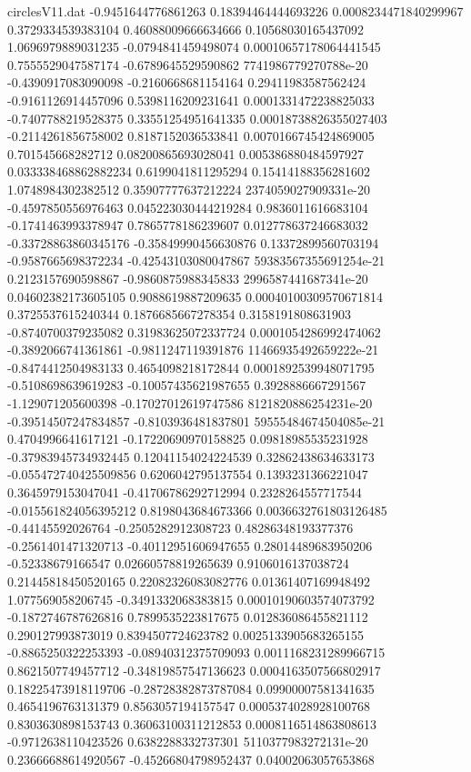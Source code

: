 \begin{filecontents}{circlesV11.dat}
-0.9451644776861263	0.18394464444693226	0.0008234471840299967
0.3729334539383104	0.46088009666634666	0.10568030165437092
1.0696979889031235	-0.0794841459498074	0.00010657178064441545
0.7555529047587174	-0.6789645529590862	7741986779270788e-20
-0.4390917083090098	-0.2160668681154164	0.29411983587562424
-0.9161126914457096	0.5398116209231641	0.0001331472238825033
-0.7407788219528375	0.33551254951641335	0.00018738826355027403
-0.2114261856758002	0.8187152036533841	0.0070166745424869005
0.701545668282712	0.08200865693028041	0.005386880484597927
0.033338468862882234	0.6199041811295294	0.15414188356281602
1.0748984302382512	0.35907777637212224	2374059027909331e-20
-0.4597850556976463	0.045223030444219284	0.9836011616683104
-0.1741463993378947	0.7865778186239607	0.012778637246683032
-0.33728863860345176	-0.35849990456630876	0.13372899560703194
-0.9587665698372234	-0.42543103080047867	59383567355691254e-21
0.2123157690598867	-0.9860875988345833	2996587441687341e-20
0.04602382173605105	0.9088619887209635	0.00040100309570671814
0.3725537615240344	0.1876685667278354	0.3158191808631903
-0.8740700379235082	0.31983625072337724	0.0001054286992474062
-0.3892066741361861	-0.9811247119391876	11466935492659222e-21
-0.8474412504983133	0.4654098218172844	0.0001892539948071795
-0.5108698639619283	-0.10057435621987655	0.3928886667291567
-1.129071205600398	-0.17027012619747586	8121820886254231e-20
-0.39514507247834857	-0.8103936481837801	59555484674504085e-21
0.4704996641617121	-0.17220690970158825	0.09818985535231928
-0.37983945734932445	0.12041154024224539	0.32862438634633173
-0.055472740425509856	0.6206042795137554	0.1393231366221047
0.3645979153047041	-0.41706786292712994	0.2328264557717544
-0.015561824056395212	0.8198043684673366	0.0036632761803126485
-0.44145592026764	-0.2505282912308723	0.48286348193377376
-0.2561401471320713	-0.40112951606947655	0.28014489683950206
-0.52338679166547	0.02660578819265639	0.9106016137038724
0.21445818450520165	0.22082326083082776	0.01361407169948492
1.077569058206745	-0.3491332068383815	0.00010190603574073792
-0.1872746787626816	0.7899535223817675	0.012836086455821112
0.290127993873019	0.8394507724623782	0.0025133905683265155
-0.8865250322253393	-0.08940312375709093	0.0011168231289966715
0.8621507749457712	-0.34819857547136623	0.0004163507566802917
0.18225473918119706	-0.28728382873787084	0.09900007581341635
0.4654196763131379	0.8563057194157547	0.0005374028928100768
0.8303630898153743	0.36063100311212853	0.0008116514863808613
-0.9712638110423526	0.6382288332737301	5110377983272131e-20
0.23666688614920567	-0.45266804798952437	0.04002063057653868

\end{filecontents}
